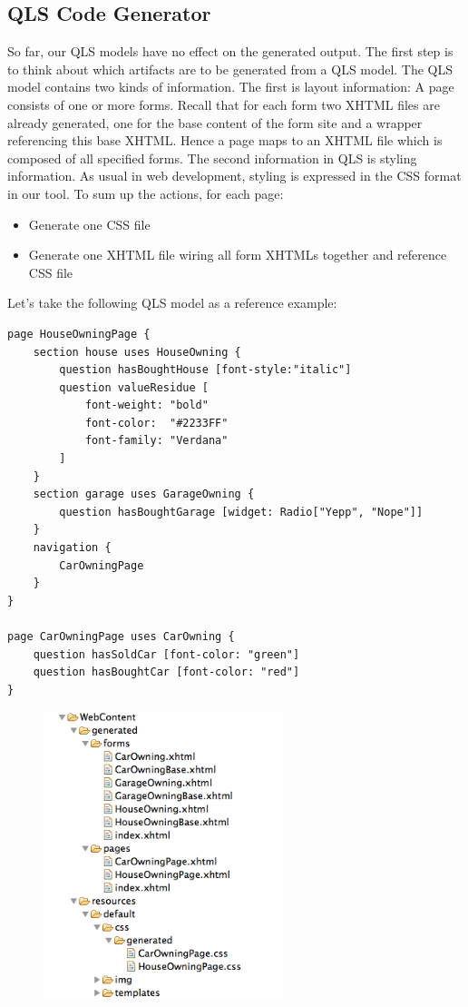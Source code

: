 \subsection{QLS Code Generator}

So far, our QLS models have no effect on the generated output. The first step
is to think about which artifacts are to be generated from a QLS model. The QLS
model contains two kinds of information. The first is layout information: A page
consists of one or more forms. Recall that for each form two XHTML files are
already generated, one for the base content of the form site and a wrapper
referencing this base XHTML. Hence a page maps to an XHTML file which is
composed of all specified forms. The second information in QLS is styling
information. As usual in web development, styling is expressed in the CSS format
in our tool. To sum up the actions, for each page:

\begin{itemize}
  \item Generate one CSS file
  \item Generate one XHTML file wiring all form XHTMLs together and reference
  CSS file
\end{itemize}

Let's take the following QLS model as a reference example:
\begin{lstlisting}[language=QLS]
page HouseOwningPage {
	section house uses HouseOwning {
		question hasBoughtHouse [font-style:"italic"]
		question valueResidue [
			font-weight: "bold" 
			font-color:  "#2233FF"
			font-family: "Verdana"
		]
	}
	section garage uses GarageOwning {
		question hasBoughtGarage [widget: Radio["Yepp", "Nope"]]		
	}
	navigation {
		CarOwningPage
	}
}

page CarOwningPage uses CarOwning {
	question hasSoldCar [font-color: "green"]
	question hasBoughtCar [font-color: "red"]
}
\end{lstlisting}


\begin{figure}
\includegraphics[width=7cm]{./images/chapter03/referenceimpl_projecttree_qls.png}
\end{figure}

